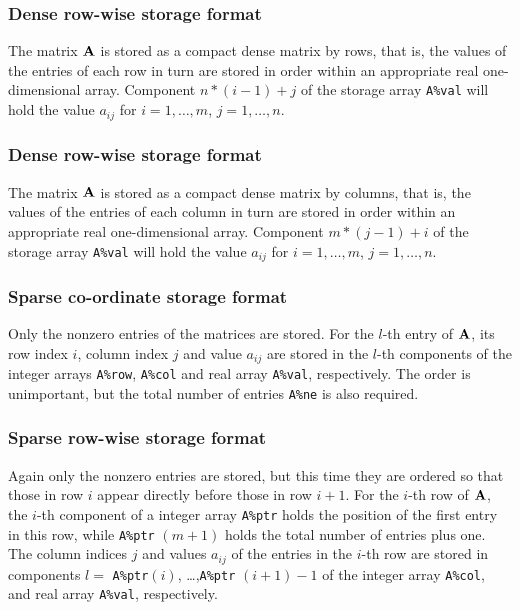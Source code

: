 \documentclass{galahad}
\begin{document}
\subsubsection{Dense row-wise storage format}\label{dense}
The matrix ${\mathbf{A}}$ is stored as a compact
dense matrix by rows, that is, the values of the entries of each row in turn are
stored in order within an appropriate real one-dimensional array.
Component $n \ast (i-1) + j$ of the storage array {\tt A\%val} will hold the
value $a_{ij}$ for $i = 1, \ldots , m$, $j = 1, \ldots , n$.

\subsubsection{Dense row-wise storage format}\label{densecolwise}
The matrix ${\mathbf{A}}$ is stored as a compact
dense matrix by columns, that is, the values of the entries of each column
in turn are stored in order within an appropriate real one-dimensional array.
Component $m \ast (j-1) + i$ of the storage array {\tt A\%val} will hold the
value $a_{ij}$ for $i = 1, \ldots , m$, $j = 1, \ldots , n$.

\subsubsection{Sparse co-ordinate storage format}\label{coordinate}
Only the nonzero entries of the matrices are stored. For the
$l$-th entry of ${\mathbf{A}}$, its row index $i$, column index $j$
and value $a_{ij}$
are stored in the $l$-th components of the integer arrays {\tt A\%row},
{\tt A\%col} and real array {\tt A\%val}, respectively.
The order is unimportant, but the total
number of entries {\tt A\%ne} is also required.

\subsubsection{Sparse row-wise storage format}\label{rowwise}
Again only the nonzero entries are stored, but this time
they are ordered so that those in row $i$ appear directly before those
in row $i+1$. For the $i$-th row of ${\mathbf{A}}$, the $i$-th component of a
integer array {\tt A\%ptr} holds the position of the first entry in this row,
while {\tt A\%ptr} $(m+1)$ holds the total number of entries plus one.
The column indices $j$ and values $a_{ij}$ of the entries in the $i$-th row
are stored in components
$l =$ {\tt A\%ptr}$(i)$, \ldots ,{\tt A\%ptr} $(i+1)-1$ of the
integer array {\tt A\%col}, and real array {\tt A\%val}, respectively.
\end{document}
